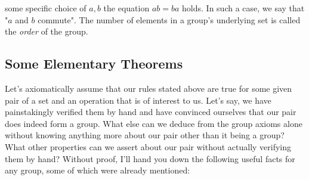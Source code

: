 some specific choice of $a,b$ the equation $a b = b a$ holds. In such a case, we say that "$a$ and $b$ commute". The number of elements in a group's underlying set is called the \emph{order} of the group.







\subsection{Some Elementary Theorems}
Let's axiomatically assume that our rules stated above are true for some given pair of a set and an operation that is of interest to us. Let's say, we have painstakingly verified them by hand and have convinced ourselves that our pair does indeed form a group. What else can we deduce from the group axioms alone without knowing anything more about our pair other than it being a group? What other properties can we assert about our pair without actually verifying them by hand? Without proof, I'll hand you down the following useful facts for any group, some of which were already mentioned: 
